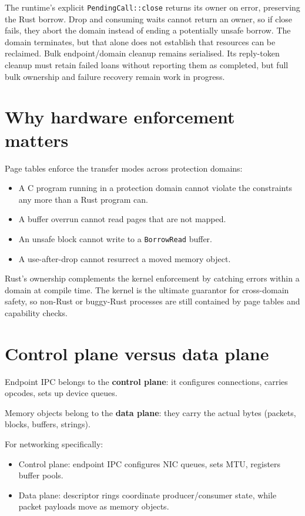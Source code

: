 The runtime's explicit \texttt{PendingCall::close} returns its owner on error,
preserving the Rust borrow. Drop and consuming waits cannot return an owner, so
if close fails, they abort the domain instead of ending a potentially unsafe
borrow. The domain terminates, but that alone does not establish that resources
can be reclaimed.
Bulk endpoint/domain cleanup remains serialised. Its reply-token cleanup must
retain failed loans without reporting them as completed, but full bulk ownership
and failure recovery remain work in progress.

\section{Why hardware enforcement matters}

Page tables enforce the transfer modes across protection domains:

\begin{itemize}
    \item A C program running in a protection domain cannot violate the
        constraints any more than a Rust program can.
    \item A buffer overrun cannot read pages that are not mapped.
    \item An unsafe block cannot write to a \texttt{BorrowRead} buffer.
    \item A use-after-drop cannot resurrect a moved memory object.
\end{itemize}

Rust's ownership complements the kernel enforcement by catching errors within a
domain at compile time. The kernel is the ultimate guarantor for cross-domain
safety, so non-Rust or buggy-Rust processes are still contained by page tables and
capability checks.

\section{Control plane versus data plane}

Endpoint IPC belongs to the \textbf{control plane}: it configures connections,
carries opcodes, sets up device queues.

Memory objects belong to the \textbf{data plane}: they carry the actual bytes
(packets, blocks, buffers, strings).

For networking specifically:

\begin{itemize}
    \item Control plane: endpoint IPC configures NIC queues, sets MTU,
        registers buffer pools.
    \item Data plane: descriptor rings coordinate producer/consumer
        state, while packet payloads move as memory objects.
\end{itemize}

